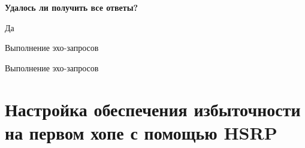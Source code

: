 \textbf{Удалось ли получить все ответы?}

Да

\begin{image}
	\caption{Выполнение эхо-запросов}
\end{image}

\begin{image}
	\caption{Выполнение эхо-запросов}
\end{image}

\section{Настройка обеспечения избыточности на первом хопе
с помощью HSRP}











